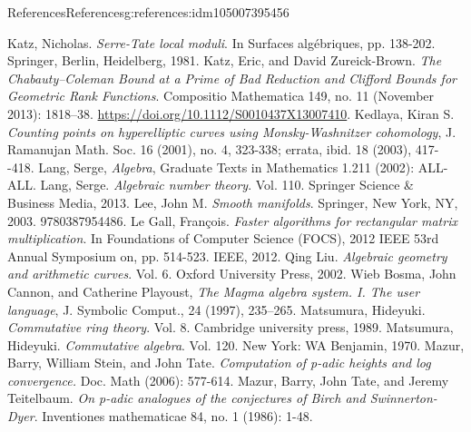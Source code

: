 \documentclass[oneside,10pt,]{book}
\numberwithin{equation}{section}
\begin{document}
\begin{references-chapter-numberless}{References}{}{References}{}{}{g:references:idm105007395456}
\begin{thebibliography}{9}
\hypertarget{x:biblio:bib-katz-serre-tate}{}Katz, Nicholas. \textit{Serre-Tate local moduli}. In Surfaces algébriques, pp. 138-202. Springer, Berlin, Heidelberg, 1981.
\hypertarget{x:biblio:bib-katz-zureick-clifford}{}Katz, Eric, and David Zureick-Brown. \textit{The Chabauty–Coleman Bound at a Prime of Bad Reduction and Clifford Bounds for Geometric Rank Functions}. Compositio Mathematica 149, no. 11 (November 2013): 1818–38. \url{https://doi.org/10.1112/S0010437X13007410}.
\hypertarget{x:biblio:bib-kedlaya-counting}{}Kedlaya, Kiran S. \textit{Counting points on hyperelliptic curves using Monsky-Washnitzer cohomology}, J. Ramanujan Math. Soc. 16 (2001), no. 4, 323-338; errata, ibid. 18 (2003), 417-{}-{}418.
\hypertarget{x:biblio:bib-lang-algebra}{}Lang, Serge,  \textit{Algebra}, Graduate Texts in Mathematics 1.211 (2002): ALL-ALL.
\hypertarget{x:biblio:bib-lang-algebraic-nt}{}Lang, Serge. \textit{Algebraic number theory}. Vol. 110. Springer Science \& Business Media, 2013.
\hypertarget{x:biblio:bib-lee-smooth}{}Lee, John M. \textit{Smooth manifolds}. Springer, New York, NY, 2003. 9780387954486.
\hypertarget{x:biblio:bib-le-gall}{}Le Gall, François. \textit{Faster algorithms for rectangular matrix multiplication}. In Foundations of Computer Science (FOCS), 2012 IEEE 53rd Annual Symposium on, pp. 514-523. IEEE, 2012.
\hypertarget{x:biblio:bib-liu}{}Qing Liu. \textit{Algebraic geometry and arithmetic curves}. Vol. 6. Oxford University Press, 2002.
\hypertarget{x:biblio:bib-magma}{}Wieb Bosma, John Cannon, and Catherine Playoust, \textit{The Magma algebra system. I. The user language}, J. Symbolic Comput., 24 (1997), 235–265.
\hypertarget{x:biblio:bib-matsumura}{}Matsumura, Hideyuki. \textit{Commutative ring theory}. Vol. 8. Cambridge university press, 1989.
\hypertarget{x:biblio:bib-matsumura-algebra}{}Matsumura, Hideyuki. \textit{Commutative algebra}. Vol. 120. New York: WA Benjamin, 1970.
\hypertarget{x:biblio:bib-mazur-stein-tate}{}Mazur, Barry, William Stein, and John Tate. \textit{Computation of p-adic heights and log convergence.} Doc. Math (2006): 577-614.
\hypertarget{x:biblio:bib-mtt}{}Mazur, Barry, John Tate, and Jeremy Teitelbaum. \textit{On p-adic analogues of the conjectures of Birch and Swinnerton-Dyer}. Inventiones mathematicae 84, no. 1 (1986): 1-48.

\end{thebibliography}
\end{references-chapter-numberless}
\end{document}
